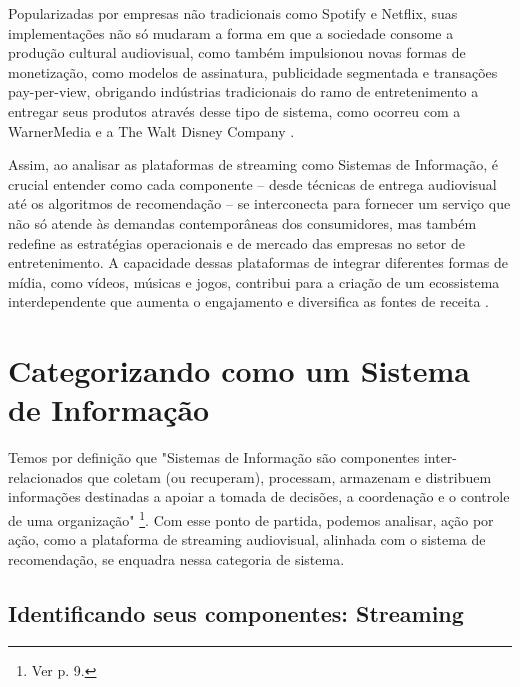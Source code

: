 \documentclass[conference]{IEEEtran}
\begin{document}
Popularizadas por empresas não tradicionais como Spotify e Netflix, suas implementações não só mudaram a forma em que a sociedade consome a produção cultural audiovisual, como também impulsionou novas formas de monetização, como modelos de assinatura, publicidade segmentada e transações pay-per-view, obrigando indústrias tradicionais do ramo de entretenimento a entregar seus produtos através desse tipo de sistema, como ocorreu com a WarnerMedia e a The Walt Disney Company \cite{b2}.

Assim, ao analisar as plataformas de streaming como Sistemas de Informação, é crucial entender como cada componente – desde técnicas de entrega audiovisual até os algoritmos de recomendação – se interconecta para fornecer um serviço que não só atende às demandas contemporâneas dos consumidores, mas também redefine as estratégias operacionais e de mercado das empresas no setor de entretenimento. A capacidade dessas plataformas de integrar diferentes formas de mídia, como vídeos, músicas e jogos, contribui para a criação de um ecossistema interdependente que aumenta o engajamento e diversifica as fontes de receita \cite{b1} \cite{b2}.
\section{Categorizando como um Sistema de Informação}

Temos por definição que "Sistemas de Informação são componentes inter-relacionados que coletam (ou recuperam), processam, armazenam e distribuem informações destinadas a apoiar a tomada de decisões, a coordenação e o controle de uma organização" \cite{b3}\footnote{Ver p. 9.}. Com esse ponto de partida, podemos analisar, ação por ação, como a plataforma de streaming audiovisual, alinhada com o sistema de recomendação, se enquadra nessa categoria de sistema.

\subsection{Identificando seus componentes: Streaming}
\end{document}
